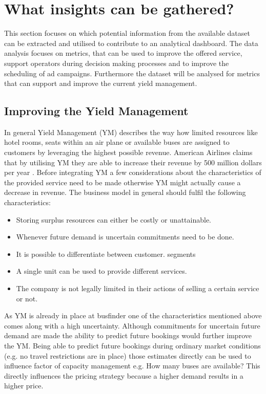 %
%
% 
% 
% 


\chapter{What insights can be gathered?}
\label{chap:insights}
This section focuses on which potential information from the available dataset can be extracted and utilised to contribute to an analytical dashboard. The data analysis focuses on metrics, that can be used to improve the offered service, support operators during decision making processes and to improve the scheduling of ad campaigns. Furthermore the dataset will be analysed for metrics that can support and improve the current yield management. 


\section{Improving the Yield Management}
In general Yield Management (YM) describes the way how limited resources like hotel rooms, seats within an air plane or available buses are assigned to customers by leveraging the highest possible revenue. American Airlines claims that by utilising YM they are able to increase their revenue by 500 million dollars per year \cite{ym_practice}. Before integrating YM a few considerations about the characteristics of the provided service need to be made otherwise YM might actually cause a decrease in revenue. The business model in general should fulfil the following characteristics:\cite{ym_practice}
\begin{itemize}
  \item Storing surplus resources can either be costly or unattainable. 
  \item Whenever future demand is uncertain commitments need to be done.
  \item It is possible to differentiate between customer. segments
  \item A single unit can be used to provide different services. 
  \item The company is not legally limited in their actions of selling a certain service or not.
\end{itemize}
As YM is already in place at busfinder one of the characteristics mentioned above comes along with a high uncertainty. Although commitments for uncertain future demand are made the ability to predict future bookings would further improve the YM. Being able to predict future bookings during ordinary market conditions (e.g. no travel restrictions are in place) those estimates directly can be used to influence factor of capacity management e.g. How many buses are available? This directly influences the pricing strategy because a higher demand results in a higher price.

